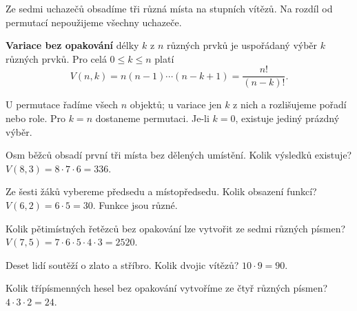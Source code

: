\documentclass[11pt,a4paper]{article}
\begin{document}

Ze sedmi uchazečů obsadíme tři různá místa na stupních vítězů. Na rozdíl od permutací nepoužijeme všechny uchazeče.



\begin{definiceBox}
\textbf{Variace bez opakování} délky $k$ z $n$ různých prvků je uspořádaný výběr $k$ různých prvků. Pro celá $0\le k\le n$ platí
\[
V(n,k)=n(n-1)\cdots(n-k+1)=\frac{n!}{(n-k)!}.
\]
\end{definiceBox}
U permutace řadíme všech $n$ objektů; u variace jen $k$ z nich a rozlišujeme pořadí nebo role. Pro $k=n$ dostaneme permutaci. Je-li $k=0$, existuje jediný prázdný výběr.


\begin{prikladReseniBox}[title={Příklad 1}]
Osm běžců obsadí první tři místa bez dělených umístění. Kolik výsledků existuje?
\tcblower
$V(8,3)=8\cdot7\cdot6=336$.
\end{prikladReseniBox}



\begin{prikladReseniBox}[title={Příklad 2}]
Ze šesti žáků vybereme předsedu a místopředsedu. Kolik obsazení funkcí?
\tcblower
$V(6,2)=6\cdot5=30$. Funkce jsou různé.
\end{prikladReseniBox}



\begin{prikladReseniBox}[title={Příklad 3}]
Kolik pětimístných řetězců bez opakování lze vytvořit ze sedmi různých písmen?
\tcblower
$V(7,5)=7\cdot6\cdot5\cdot4\cdot3=2520$.
\end{prikladReseniBox}




\begin{zadaniReseniBox}[title={Samostatná práce 1}]
Deset lidí soutěží o zlato a stříbro. Kolik dvojic vítězů?
\tcblower
$10\cdot9=90$.
\end{zadaniReseniBox}



\begin{zadaniReseniBox}[title={Samostatná práce 2}]
Kolik třípísmenných hesel bez opakování vytvoříme ze čtyř různých písmen?
\tcblower
$4\cdot3\cdot2=24$.
\end{zadaniReseniBox}
\end{document}
